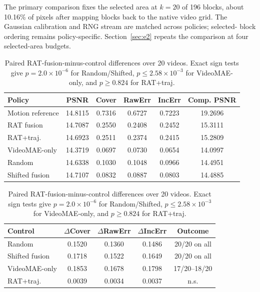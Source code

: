 The primary comparison fixes the selected area at \(k=20\) of 196 blocks,
about 10.16\% of pixels after mapping blocks back to the native video grid.
The Gaussian calibration and RNG stream are matched across policies; selected-
block ordering remains policy-specific. Section~\ref{sec:e2} repeats the
comparison at four selected-area budgets.

\begin{table}[t]
\caption{Aggregate same-backend mask-isolation results on 20 UCF101 videos.
Only the mask policy changes.}
\label{tab:mask}
\centering
\small
\setlength{\tabcolsep}{3pt}
\begin{tabular}{lccccc}
\toprule
\textbf{Policy} & \textbf{PSNR} & \textbf{Cover} & \textbf{RawErr} & \textbf{IncErr} & \textbf{Comp. PSNR} \\
\midrule
Motion reference & 14.8115 & 0.7316 & 0.6727 & 0.7223 & 19.2696 \\
RAT fusion & 14.7087 & 0.2550 & 0.2408 & 0.2452 & 15.3111 \\
RAT+traj. & 14.6923 & 0.2511 & 0.2374 & 0.2415 & 15.2809 \\
VideoMAE-only & 14.3719 & 0.0697 & 0.0730 & 0.0654 & 14.0997 \\
Random & 14.6338 & 0.1030 & 0.1048 & 0.0966 & 14.4951 \\
Shifted fusion & 14.7107 & 0.0832 & 0.0887 & 0.0803 & 14.4885 \\
\bottomrule
\end{tabular}
\par\medskip
\caption{Paired RAT-fusion-minus-control differences over 20 videos. Exact sign
tests give \(p=2.0{\times}10^{-6}\) for Random/Shifted,
\(p\leq2.58{\times}10^{-3}\) for VideoMAE-only, and \(p\geq0.824\) for
RAT+traj.}
\label{tab:paired}
\centering
\small
\setlength{\tabcolsep}{4pt}
\begin{tabular}{lcccc}
\toprule
\textbf{Control} & \textbf{\(\Delta\)Cover} & \textbf{\(\Delta\)RawErr} & \textbf{\(\Delta\)IncErr} & \textbf{Outcome} \\
\midrule
Random & 0.1520 & 0.1360 & 0.1486 & 20/20 on all \\
Shifted fusion & 0.1718 & 0.1522 & 0.1649 & 20/20 on all \\
VideoMAE-only & 0.1853 & 0.1678 & 0.1798 & 17/20--18/20 \\
RAT+traj. & 0.0039 & 0.0034 & 0.0037 & n.s. \\
\bottomrule
\end{tabular}
\end{table}

